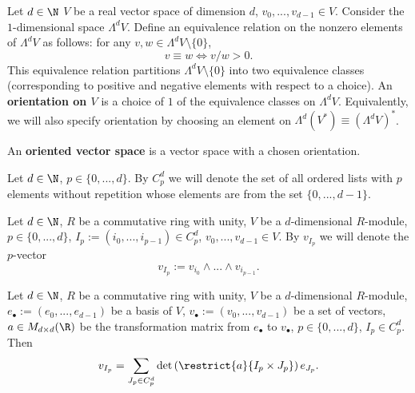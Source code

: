 \begin{definition}
  Let
    $d \in \N$
    $V$ be a real vector space of dimension $d$,
    $v_0, ..., v_{d - 1} \in V$.
  Consider the $1$-dimensional space $\Lambda^d V$.
  Define an equivalence relation on the nonzero elements of $\Lambda^d V$
  as follows: for any $v, w \in \Lambda^d V \setminus \{0\}$,
  \begin{equation}
    v \equiv w \Leftrightarrow v / w > 0.
  \end{equation}
  This equivalence relation partitions $\Lambda^d V \setminus \{0\}$ into two
  equivalence classes
  (corresponding to positive and negative elements with respect to a choice).
  An \textbf{orientation on $V$} is a choice of $1$ of the equivalence classes
  on $\Lambda^d V$.
  Equivalently, we will also specify orientation by choosing an element on
  $\Lambda^d (V^*) \equiv (\Lambda^d V)^*$.

  An \textbf{oriented vector space} is a vector space with a chosen orientation.
\end{definition}
\begin{notation}
  Let
    $d \in \N$,
    $p \in \{0, ..., d\}$.
  By $C^d_p$ we will denote the set of all ordered lists with $p$ elements
  without repetition whose elements are from the set $\{0, ..., d - 1\}$.
\end{notation}
\begin{notation}
  Let
    $d \in \N$,
    $R$ be a commutative ring with unity,
    $V$ be a $d$-dimensional $R$-module,
    $p \in \{0, ..., d\}$,
    $I_p := (i_0, ..., i_{p - 1}) \in C^d_p$,
    $v_0, ..., v_{d - 1} \in V$.
  By $v_{I_p}$ we will denote the $p$-vector
  \begin{equation}
    v_{I_p} := v_{i_0} \wedge ... \wedge v_{i_{p - 1}}.
  \end{equation}
\end{notation}
\begin{proposition}
  Let
    $d \in \N$,
    $R$ be a commutative ring with unity,
    $V$ be a $d$-dimensional $R$-module,
    $e_\bullet := (e_0, ..., e_{d - 1})$ be a basis of $V$,
    $v_\bullet := (v_0, ..., v_{d - 1})$ be a set of vectors,
    $a \in M_{d \times d}(\R)$ be the transformation matrix from
      $e_\bullet$ to $v_\bullet$,
    $p \in \{0, ..., d\}$,
    $I_p \in C^d_p$.
  Then
  \begin{equation}
    v_{I_p} =
    \sum_{J_p \in C^d_p} \det \left(\restrict{a}{I_p \times J_p}\right) e_{J_p}.
  \end{equation}
\end{proposition}
